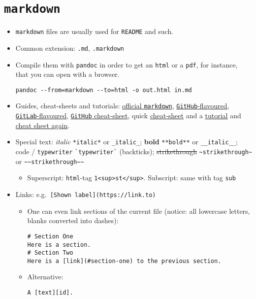 \documentclass[a4paper,12pt,%
              final%
              ]{article}
\begin{document}
\section{\texttt{markdown}}
\label{sec:markdown}
\begin{itemize}
  \item \texttt{markdown} files are usually used for \texttt{README} and such.
  \item Common extension: \texttt{.md}, \texttt{.markdown}
  \item Compile them with \texttt{pandoc} in order to get an \texttt{html} or a \texttt{pdf}, for instance, that you can open with a browser.
\begin{verbatim}
pandoc --from=markdown --to=html -o out.html in.md
\end{verbatim}
  \item Guides, cheat-sheets and tutorials:
    \href{https://daringfireball.net/projects/markdown/syntax}{official \texttt{markdown}},
    \href{https://docs.github.com/en/github/writing-on-github/basic-writing-and-formatting-syntax}{\texttt{GitHub}-flavoured},
    \href{https://docs.gitlab.com/ee/user/markdown.html}{\texttt{GitLab}-flavoured},
    \href{https://github.com/adam-p/markdown-here/wiki/Markdown-Cheatsheet}{\texttt{GitHub} cheat-sheet},
    quick \href{https://commonmark.org/help/}{cheat-sheet} and a
    \href{https://agea.github.io/tutorial.md/}{tutorial} and
    \href{https://enterprise.github.com/downloads/en/markdown-cheatsheet.pdf}{cheat sheet again}.
  \item Special text: \textit{italic} \verb|*italic*| or \verb|_italic_|; \textbf{bold} \verb|**bold**| or \verb|__italic__|; code / \texttt{typewriter} \verb|`typewriter`| (backticks); \sout{strikethrough} \verb|~strikethrough~| or \verb|~~strikethrough~~|
    \begin{itemize}
      \item Superscript: \texttt{html}-tag \verb|1<sup>st</sup>|. Subscript: same with tag \texttt{sub}
    \end{itemize}
  \item Links: e.g.\ \verb|[Shown label](https://link.to)|
    \begin{itemize}
      \item One can even link sections of the current file (notice: all lowercase letters, blanks converted into dashes):
\begin{verbatim}
# Section One
Here is a section.
# Section Two
Here is a [link](#section-one) to the previous section.
\end{verbatim}
      \item Alternative:
\begin{verbatim}
A [text][id].


\end{verbatim}
\end{itemize}
\end{itemize}
\end{document}
